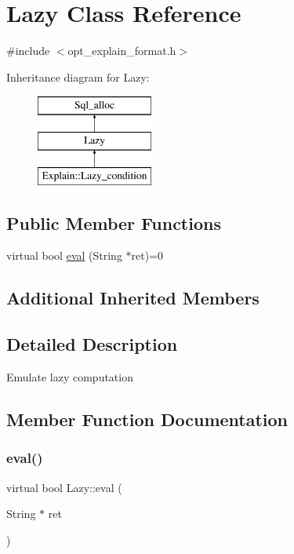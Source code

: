 \hypertarget{classLazy}{}\section{Lazy Class Reference}
\label{classLazy}


{\ttfamily \#include $<$opt\+\_\+explain\+\_\+format.\+h$>$}

Inheritance diagram for Lazy\+:\begin{figure}[H]
\begin{center}
\leavevmode
\includegraphics[height=3.000000cm]{classLazy}
\end{center}
\end{figure}
\subsection*{Public Member Functions}
\begin{DoxyCompactItemize}
\item 
virtual bool \mbox{\hyperlink{classLazy_ac3fda1792b722409e31ee1d73bde3595}{eval}} (String $\ast$ret)=0
\end{DoxyCompactItemize}
\subsection*{Additional Inherited Members}


\subsection{Detailed Description}
Emulate lazy computation 

\subsection{Member Function Documentation}
\mbox{\label{classLazy_ac3fda1792b722409e31ee1d73bde3595}} 
\subsubsection{\texorpdfstring{eval()}{eval()}}
{\footnotesize\ttfamily virtual bool Lazy\+::eval (\begin{DoxyParamCaption}\item[{String $\ast$}]{ret }\end{DoxyParamCaption})\hspace{0.3cm}{\ttfamily [pure virtual]}}

